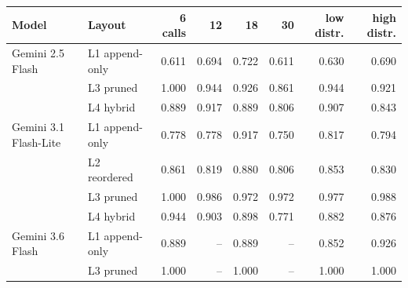 \begin{tabular}{llrrrrrr}
\toprule
\textbf{Model} & \textbf{Layout} & \textbf{6 calls} & \textbf{12} & \textbf{18} & \textbf{30} & \textbf{low distr.} & \textbf{high distr.} \\
\midrule
Gemini 2.5 Flash & L1 append-only & 0.611 & 0.694 & 0.722 & 0.611 & 0.630 & 0.690 \\
 & L3 pruned & 1.000 & 0.944 & 0.926 & 0.861 & 0.944 & 0.921 \\
 & L4 hybrid & 0.889 & 0.917 & 0.889 & 0.806 & 0.907 & 0.843 \\
\midrule
Gemini 3.1 Flash-Lite & L1 append-only & 0.778 & 0.778 & 0.917 & 0.750 & 0.817 & 0.794 \\
 & L2 reordered & 0.861 & 0.819 & 0.880 & 0.806 & 0.853 & 0.830 \\
 & L3 pruned & 1.000 & 0.986 & 0.972 & 0.972 & 0.977 & 0.988 \\
 & L4 hybrid & 0.944 & 0.903 & 0.898 & 0.771 & 0.882 & 0.876 \\
\midrule
Gemini 3.6 Flash & L1 append-only & 0.889 & -- & 0.889 & -- & 0.852 & 0.926 \\
 & L3 pruned & 1.000 & -- & 1.000 & -- & 1.000 & 1.000 \\
\bottomrule
\end{tabular}
